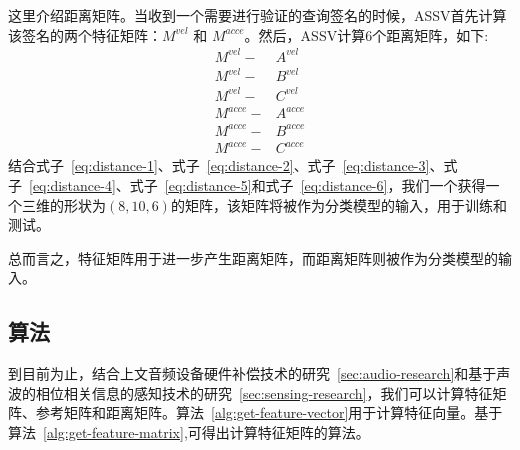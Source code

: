 这里介绍距离矩阵。当收到一个需要进行验证的查询签名的时候，ASSV首先计算该签名的两个特征矩阵：$M^{vel}$ 和 $M^{acce}$。然后，ASSV计算6个距离矩阵，如下:
\begin{align}
M^{vel} -& A^{vel}  \label{eq:distance-1} \\
M^{vel} -& B^{vel}  \label{eq:distance-2} \\
M^{vel} -& C^{vel}  \label{eq:distance-3} \\
M^{acce} -& A^{acce} \label{eq:distance-4} \\
M^{acce} -& B^{acce} \label{eq:distance-5} \\
M^{acce} -& C^{acce} \label{eq:distance-6}
\end{align}
结合式子~\ref{eq:distance-1}、式子~\ref{eq:distance-2}、式子~\ref{eq:distance-3}、式子~\ref{eq:distance-4}、式子~\ref{eq:distance-5}和式子~\ref{eq:distance-6}，我们一个获得一个三维的形状为$(8,10,6)$的矩阵，该矩阵将被作为分类模型的输入，用于训练和测试。

总而言之，特征矩阵用于进一步产生距离矩阵，而距离矩阵则被作为分类模型的输入。

\subsection{算法}

到目前为止，结合上文音频设备硬件补偿技术的研究~\ref{sec:audio-research}和基于声波的相位相关信息的感知技术的研究~\ref{sec:sensing-research}，我们可以计算特征矩阵、参考矩阵和距离矩阵。算法~\ref{alg:get-feature-vector}用于计算特征向量。基于算法~\ref{alg:get-feature-matrix},可得出计算特征矩阵的算法。

